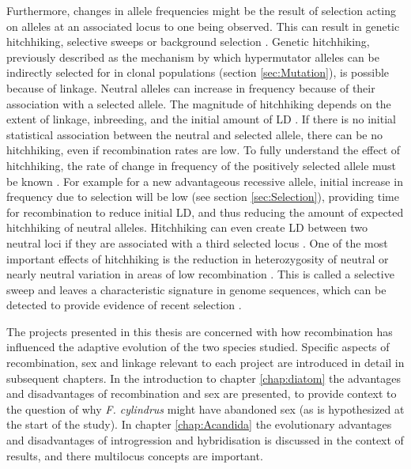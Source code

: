 Furthermore, changes in allele frequencies might be the result of selection acting on alleles at an associated locus to one being observed.
This can result in genetic hitchhiking, selective sweeps or background selection \parencite{Charlesworth2010}.
Genetic hitchhiking, previously described as the mechanism by which hypermutator alleles can be indirectly selected for in clonal populations (section \ref{sec:Mutation}), is possible because of linkage.
Neutral alleles can increase in frequency because of their association with a selected allele.
The magnitude of hitchhiking depends on the extent of linkage, inbreeding, and the initial amount of LD \parencite{Thomson1977,Hedrick1980,Kaplan1989}.
If there is no initial statistical association between the neutral and selected allele, there can be no hitchhiking, even if recombination rates are low.
To fully understand the effect of hitchhiking, the rate of change in frequency of the positively selected allele must be known \parencite{Hedrick2010}.
For example for a new advantageous recessive allele, initial increase in frequency due to selection will be low (see section \ref{sec:Selection}), providing time for recombination to reduce initial LD, and thus reducing the amount of expected hitchhiking of neutral alleles.
Hitchhiking can even create LD between two neutral loci if they are associated with a third selected locus \parencite{Thomson1977,Hedrick1980}.
One of the most important effects of hitchhiking is the reduction in heterozygosity of neutral or nearly neutral variation in areas of low recombination \parencite{Maynard-Smith1974}.
This is called a selective sweep and leaves a characteristic signature in genome sequences, which can be detected to provide evidence of recent selection \parencite{Hedrick2010}.

The projects presented in this thesis are concerned with how recombination has influenced the adaptive evolution of the two species studied. Specific aspects of recombination, sex and linkage relevant to each project are introduced in detail in subsequent chapters.
In the introduction to chapter \ref{chap:diatom} the advantages and disadvantages of recombination and sex are presented, to provide context to the question of why \textit{F. cylindrus} might have abandoned sex (as is hypothesized at the start of the study).
In chapter \ref{chap:Acandida} the evolutionary advantages and disadvantages of introgression and hybridisation is discussed in the context of results, and there multilocus concepts are important. 


